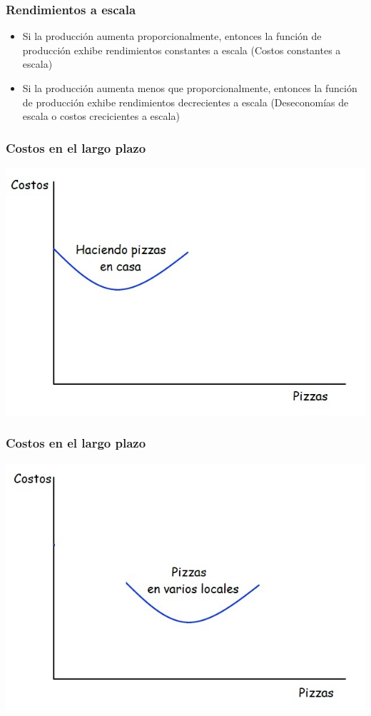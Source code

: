 \documentclass{beamer}
\begin{document}
\begin{frame}
\frametitle{ Rendimientos a escala}
\begin{itemize}
    \item Si la producción aumenta proporcionalmente, entonces la función de producción exhibe rendimientos constantes a escala (Costos constantes a escala)
    \item Si la producción aumenta menos que proporcionalmente, entonces la función de producción exhibe rendimientos decrecientes a escala (Deseconomías de escala o costos crecicientes a escala)
\end{itemize}
\end{frame}

\begin{frame}
\frametitle{ Costos en el largo plazo}
\centering
\includegraphics[scale=0.6]{Figures/Tema_06.24.jpg}
\end{frame}

\begin{frame}
\frametitle{ Costos en el largo plazo}
\centering
\includegraphics[scale=0.6]{Figures/Tema_06.25.jpg}
\end{frame}
\end{document}
